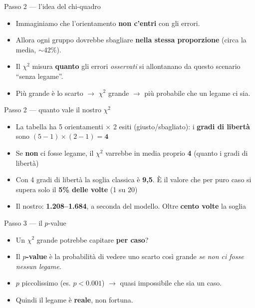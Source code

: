 \documentclass[aspectratio=169]{beamer}
\newcommand{\hl}[1]{\textbf{#1}}
\begin{document}
\begin{frame}{Passo 2 --- l'idea del chi-quadro}
  \vfill
  \begin{itemize}[<+->]
    \setlength\itemsep{0.9em}
    \item Immaginiamo che l'orientamento \hl{non c'entri} con gli errori.
    \item Allora ogni gruppo dovrebbe sbagliare \hl{nella stessa proporzione} (circa la media, $\sim$42\%).
    \item Il $\chi^2$ misura \hl{quanto} gli errori \emph{osservati} si allontanano da questo scenario ``senza legame''.
    \item Pi\`u grande \`e lo scarto $\rightarrow$ $\chi^2$ grande $\rightarrow$ pi\`u probabile che un legame ci sia.
  \end{itemize}
  \vfill
\end{frame}

\begin{frame}{Passo 2 --- quanto vale il nostro $\chi^2$}
  \vfill
  \begin{itemize}[<+->]
    \setlength\itemsep{0.7em}
    \item La tabella ha 5 orientamenti $\times$ 2 esiti (giusto/sbagliato): i \hl{gradi di libert\`a} sono $(5-1)\times(2-1)=\hl{4}$
    \item Se \hl{non} ci fosse legame, il $\chi^2$ varrebbe in media proprio \hl{4} (quanto i gradi di libert\`a)
    \item Con 4 gradi di libert\`a la soglia classica \`e \hl{9,5}. \`E il valore che per puro caso si supera solo il \hl{5\% delle volte} (1 su 20)
    \item Il nostro: \hl{1.208--1.684}, a seconda del modello. Oltre \hl{cento volte} la soglia
  \end{itemize}
  \vfill
\end{frame}

\begin{frame}{Passo 3 --- il $p$-value}
  \vfill
  \begin{itemize}[<+->]
    \setlength\itemsep{0.9em}
    \item Un $\chi^2$ grande potrebbe capitare \hl{per caso}?
    \item Il \hl{$p$-value} \`e la probabilit\`a di vedere uno scarto cos\`i grande \emph{se non ci fosse nessun legame}.
    \item $p$ piccolissimo (es. $p<0.001$) $\rightarrow$ quasi impossibile che sia un caso.
    \item Quindi il legame \`e \hl{reale}, non fortuna.
  \end{itemize}
  \vfill
\end{frame}
\end{document}
